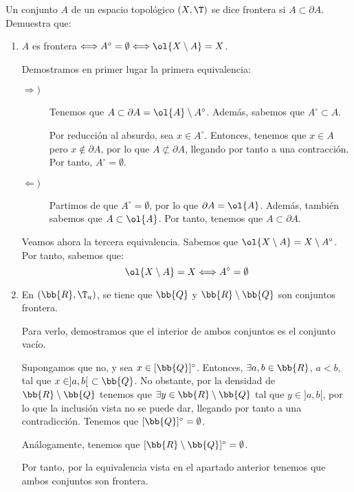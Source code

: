 \begin{ejercicio}
    Un conjunto $A$ de un espacio topológico $(X,\T)$ se dice frontera si $A\subset \partial A$. Demuestra que:
    \begin{enumerate}
        \item $A$ es frontera $\Longleftrightarrow A^\circ =\emptyset \Longleftrightarrow \ol{X\setminus A}=X$.

        Demostramos en primer lugar la primera equivalencia:
        \begin{description}
            \item[$\Longrightarrow)$] Tenemos que $A\subset \partial A=\ol{A}\setminus A^\circ$. Además, sabemos que $A^\circ \subset A$.

            Por reducción al absurdo, sea $x\in A^\circ$. Entonces, tenemos que $x\in A$ pero $x\notin \partial A$, por lo que $A\not \subset \partial A$, llegando por tanto a una contracción. Por tanto, $A^\circ = \emptyset$.

            \item[$\Longleftarrow)$] Partimos de que $A^\circ = \emptyset$, por lo que $\partial A=\ol{A}$. Además, también sabemos que $A\subset \ol{A}$. Por tanto, tenemos que $A\subset \partial A$.
        \end{description}

        Veamos ahora la tercera equivalencia. Sabemos que $\ol{X\setminus A}=X\setminus A^\circ$. Por tanto, sabemos que:
        \begin{equation*}
            \ol{X\setminus A}=X
            \Longleftrightarrow 
            A^\circ =\emptyset 
        \end{equation*}
        
        \item En $(\bb{R}, \T_u)$, se tiene que $\bb{Q}$ y $\bb{R}\setminus \bb{Q}$ son conjuntos frontera.

        Para verlo, demostramos que el interior de ambos conjuntos es el conjunto vacío.

        Supongamos que no, y sea $x\in [\bb{Q}]^\circ$. Entonces, $\exists a,b\in \bb{R}$, $a<b$, tal que $x\in ]a,b[~\subset \bb{Q}$. No obstante, por la densidad de $\bb{R}\setminus \bb{Q}$ tenemos que $\exists y\in \bb{R}\setminus \bb{Q}$ tal que $y\in ]a,b[$, por lo que la inclusión vista no se puede dar, llegando por tanto a una contradicción. Tenemos que $[\bb{Q}]^\circ=\emptyset$.

        Análogamente, tenemos que $[\bb{R}\setminus \bb{Q}]^\circ=\emptyset$.

        Por tanto, por la equivalencia vista en el apartado anterior tenemos que ambos conjuntos son frontera.
    \end{enumerate}
\end{ejercicio}

